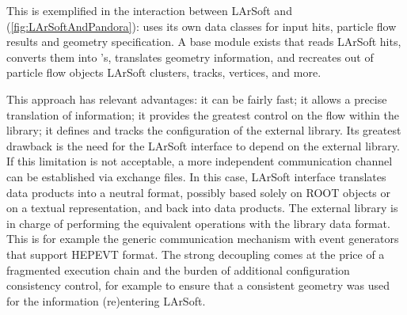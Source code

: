 This is exemplified in the interaction between LArSoft and
\Pandora (\cref{fig:LArSoftAndPandora}): \Pandora uses
its own data classes for input hits, particle flow results and geometry
specification. A base module exists that reads LArSoft hits, converts
them into \Pandora's, translates geometry information, and
recreates out of \Pandora particle flow objects LArSoft clusters,
tracks, vertices, and more.

This approach has relevant advantages: it can be fairly fast; it allows
a precise translation of information; it provides the greatest control
on the flow within the library; it defines and tracks the configuration
of the external library. Its greatest drawback is the need for the
LArSoft interface to depend on the external library. If this limitation
is not acceptable, a more independent communication channel can be
established via exchange files. In this case, LArSoft interface
translates data products into a neutral format, possibly based solely on
ROOT objects or on a textual representation, and back into data
products. The external library is in charge of performing the equivalent
operations with the library data format. This is for example the generic
communication mechanism with event generators that support HEPEVT
format. The strong decoupling comes at the price of a fragmented
execution chain and the burden of additional configuration consistency
control, for example to ensure that a consistent geometry was used for
the information (re)entering LArSoft.
